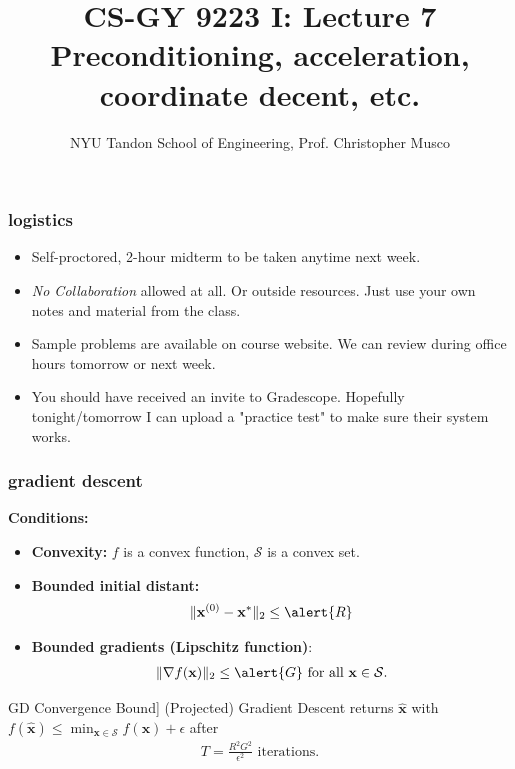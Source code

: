\documentclass[compress]{beamer}
\title{CS-GY 9223 I: Lecture 7 \\ Preconditioning, acceleration, coordinate decent, etc.}
\author{NYU Tandon School of Engineering, Prof. Christopher Musco}
\date{}
\newcommand{\bv}[1]{\mathbf{#1}}
\begin{document}
\begin{frame}
	\titlepage 
\end{frame}


\begin{frame}[t]
	\frametitle{logistics}
	\begin{itemize}
		\item Self-proctored, 2-hour midterm to be taken anytime next week.
		\item \emph{No Collaboration} allowed at all. Or outside resources. Just use your own notes and material from the class. 
		\item Sample problems are available on course website. We can review during office hours tomorrow or next week. 
		\item You should have received an invite to Gradescope. Hopefully tonight/tomorrow I can upload a "practice test" to make sure their system works. 
	\end{itemize}
\end{frame}

\begin{frame}[t]
	\frametitle{gradient descent}
	\textbf{Conditions:}
	\begin{itemize}
		\item \textbf{Convexity:} $f$ is a convex function, $\mathcal{S}$ is a convex set. 
		\item \textbf{Bounded initial distant:} 
		\begin{align*}
			\|\bv{x}^{(0)} - \bv{x}^*\|_2 \leq \alert{R}
		\end{align*}
		\item \textbf{Bounded gradients (Lipschitz function)}: 
		\begin{align*}
			\|\nabla f(\bv{x})\|_2 \leq \alert{G} \text{ for all } \bv{x}\in \mathcal{S}.
		\end{align*}
	\end{itemize}
	
	\begin{theorem}[]GD Convergence Bound]
	(Projected) Gradient Descent returns $\hat{\bv{x}}$ with $f(\hat{\bv{x}}) \leq \min_{\bv{x}\in \mathcal{S}}f(\bv{x})+\epsilon$ after
	\begin{align*}
		T = \frac{R^2 G^2}{\epsilon^2} \text{ iterations.}
	\end{align*}
	\end{theorem}
\end{frame}
\end{document}
